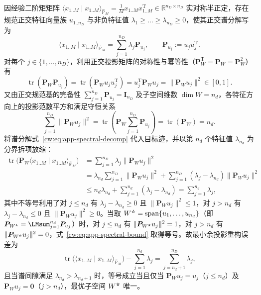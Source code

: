 因经验二阶矩矩阵 $\langle x_{1..M}\mid x_{1..M}\rangle_{\hat{\mathbb P}_M}=\frac1M x_{1..M}x_{1..M}^{\mathrm T}\in\mathbb R^{n_D\times n_D}$ 实对称半正定，存在规范正交特征向量族 $u_{1..n_D}$ 与非负特征值 $\lambda_1\ge\dots\ge\lambda_{n_D}\ge0$，使其正交谱分解写为
\begin{equation}\label{cw:eq:app-spectral-decomp}
\langle x_{1..M}\mid x_{1..M}\rangle_{\hat{\mathbb P}_M}
=\sum_{j=1}^{n_D}\lambda_j\bm P_{u_j},\qquad
\bm P_{u_j}:=u_ju_j^{\mathrm T}.
\end{equation}
对每个 $j\in\{1,\dots,n_D\}$，利用正交投影矩阵的对称性与幂等性（$\bm P_W^{\mathrm T}=\bm P_W=\bm P_W^2$）有
\begin{equation}
\operatorname{tr}(\bm P_W\bm P_{u_j})
=\operatorname{tr}(\bm P_W u_ju_j^{\mathrm T})
=u_j^{\mathrm T}\bm P_W u_j
=\|\bm P_W u_j\|^2\in[0,1].
\end{equation}
又由正交规范基的完备性 $\sum_{j=1}^{n_D}\bm P_{u_j}=\bm I_{n_D}$ 及子空间维数 $\dim W=n_d$，各特征方向上的投影范数平方和满足守恒关系
\begin{equation}
\sum_{j=1}^{n_D}\|\bm P_W u_j\|^2
=\operatorname{tr}\!\left(\bm P_W\sum_{j=1}^{n_D}\bm P_{u_j}\right)
=\operatorname{tr}(\bm P_W)=n_d.
\end{equation}
将谱分解式~\eqref{cw:eq:app-spectral-decomp} 代入目标迹，并以第 $n_d$ 个特征值 $\lambda_{n_d}$ 为分界拆项放缩：
\begin{equation}\label{cw:eq:app-spectral-bound}
\begin{aligned}
\operatorname{tr}\bigl(\bm P_W\langle x_{1..M}\mid x_{1..M}\rangle_{\hat{\mathbb P}_M}\bigr)
&=\sum_{j=1}^{n_D}\lambda_j\|\bm P_W u_j\|^2\\
&=\lambda_{n_d}\sum_{j=1}^{n_D}\|\bm P_W u_j\|^2+\sum_{j=1}^{n_D}(\lambda_j-\lambda_{n_d})\|\bm P_W u_j\|^2\\
&\le n_d\lambda_{n_d}+\sum_{j=1}^{n_d}(\lambda_j-\lambda_{n_d})
=\sum_{j=1}^{n_d}\lambda_j,
\end{aligned}
\end{equation}
其中不等号利用了对 $j\le n_d$ 有 $\lambda_j-\lambda_{n_d}\ge0$ 且 $\|\bm P_W u_j\|^2\le1$，对 $j>n_d$ 有 $\lambda_j-\lambda_{n_d}\le0$ 且 $\|\bm P_W u_j\|^2\ge0$。当取 $W^{\optstar}=\operatorname{span}\{u_1,\dots,u_{n_d}\}$（即 $\bm P_{W^{\optstar}}=\sum_{j=1}^{n_d}\bm P_{u_j}$）时，对 $j\le n_d$ 有 $\|\bm P_{W^{\optstar}}u_j\|^2=1$，对 $j>n_d$ 有 $\|\bm P_{W^{\optstar}}u_j\|^2=0$，式~\eqref{cw:eq:app-spectral-bound} 取得等号。故最小余投影重构误差为
\begin{equation}
\operatorname{tr}\bigl(\langle x_{1..M}\mid x_{1..M}\rangle_{\hat{\mathbb P}_M}\bigr)-\sum_{j=1}^{n_d}\lambda_j
=\sum_{j=n_d+1}^{n_D}\lambda_j,
\end{equation}
且当谱间隙满足 $\lambda_{n_d}>\lambda_{n_d+1}$ 时，等号成立当且仅当 $\bm P_W u_j=u_j$（$j\le n_d$）及 $\bm P_W u_j=\bm 0$（$j>n_d$），最优子空间 $W^{\optstar}$ 唯一。
